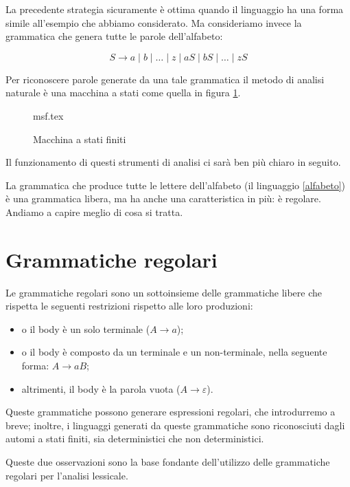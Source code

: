 \documentclass[class=book, crop=false, oneside, 12pt]{standalone}
\begin{document}
La precedente strategia sicuramente è ottima quando il linguaggio ha una forma simile all'esempio che abbiamo considerato. Ma consideriamo invece la grammatica che genera tutte le parole dell’alfabeto:

\begin{equation}
    \label{alfabeto}
    S \to a \mid b \mid … \mid z \mid aS \mid bS \mid … \mid zS
\end{equation}

Per riconoscere parole generate da una tale grammatica il metodo di analisi naturale è una macchina a stati come quella in figura \ref{macchina_a_stati_finiti}.

\begin{figure}[H]
	\centering
	{msf.tex}
    \caption{Macchina a stati finiti}
	\label{macchina_a_stati_finiti}
\end{figure}

\noindent Il funzionamento di questi strumenti di analisi ci sarà ben più chiaro in seguito.

La grammatica che produce tutte le lettere dell’alfabeto (il linguaggio \ref{alfabeto}) è una grammatica libera, ma ha anche una caratteristica in più: è regolare. Andiamo a capire meglio di cosa si tratta.


\section{Grammatiche regolari}

Le grammatiche regolari sono un sottoinsieme delle grammatiche libere che rispetta le seguenti restrizioni rispetto alle loro produzioni:

\begin{itemize}
    \item o il body è un solo terminale (\(A \to a\));
    \item o il body è composto da un terminale e un non-terminale, nella seguente forma: \(A \to aB\);  
    \item altrimenti, il body è la parola vuota (\(A \to \varepsilon\)).
\end{itemize}

Queste grammatiche possono generare espressioni regolari, che introdurremo a breve; inoltre, i linguaggi generati da queste grammatiche sono riconosciuti dagli automi a stati finiti, sia deterministici che non deterministici.

Queste due osservazioni sono la base fondante dell'utilizzo delle grammatiche regolari per l’analisi lessicale.
\end{document}
